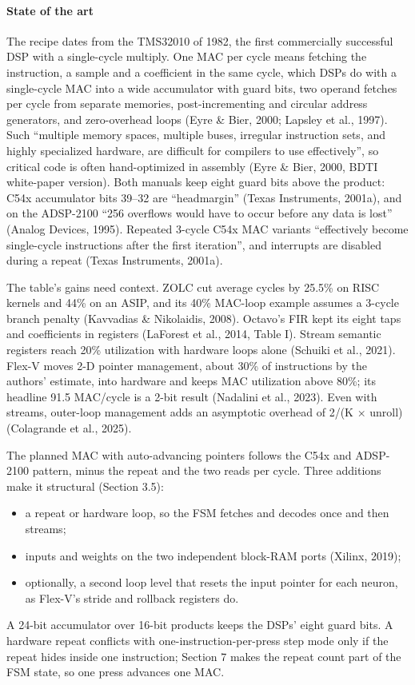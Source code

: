 \paragraph{State of the art} The recipe dates from the TMS32010 of 1982, the first commercially successful DSP with a single-cycle multiply. One MAC per cycle means fetching the instruction, a sample and a coefficient in the same cycle, which DSPs do with a single-cycle MAC into a wide accumulator with guard bits, two operand fetches per cycle from separate memories, post-incrementing and circular address generators, and zero-overhead loops (Eyre \& Bier, 2000; Lapsley et al., 1997). Such “multiple memory spaces, multiple buses, irregular instruction sets, and highly specialized hardware, are difficult for compilers to use effectively”, so critical code is often hand-optimized in assembly (Eyre \& Bier, 2000, BDTI white-paper version). Both manuals keep eight guard bits above the product: C54x accumulator bits 39–32 are “headmargin” (Texas Instruments, 2001a), and on the ADSP-2100 “256 overflows would have to occur before any data is lost” (Analog Devices, 1995). Repeated 3-cycle C54x MAC variants “effectively become single-cycle instructions after the first iteration”, and interrupts are disabled during a repeat (Texas Instruments, 2001a).

The table's gains need context. ZOLC cut average cycles by 25.5\% on RISC kernels and 44\% on an ASIP, and its 40\% MAC-loop example assumes a 3-cycle branch penalty (Kavvadias \& Nikolaidis, 2008). Octavo's FIR kept its eight taps and coefficients in registers (LaForest et al., 2014, Table I). Stream semantic registers reach 20\% utilization with hardware loops alone (Schuiki et al., 2021). Flex-V moves 2-D pointer management, about 30\% of instructions by the authors' estimate, into hardware and keeps MAC utilization above 80\%; its headline 91.5 MAC/cycle is a 2-bit result (Nadalini et al., 2023). Even with streams, outer-loop management adds an asymptotic overhead of 2/(K × unroll) (Colagrande et al., 2025).

\begin{forls}[For LS]
The planned MAC with auto-advancing pointers follows the C54x and ADSP-2100 pattern, minus the repeat and the two reads per cycle. Three additions make it structural (Section 3.5):
\begin{itemize}
\item a repeat or hardware loop, so the FSM fetches and decodes once and then streams;
\item inputs and weights on the two independent block-RAM ports (Xilinx, 2019);
\item optionally, a second loop level that resets the input pointer for each neuron, as Flex-V's stride and rollback registers do.
\end{itemize}

A 24-bit accumulator over 16-bit products keeps the DSPs' eight guard bits. A hardware repeat conflicts with one-instruction-per-press step mode only if the repeat hides inside one instruction; Section 7 makes the repeat count part of the FSM state, so one press advances one MAC.

\end{forls}
